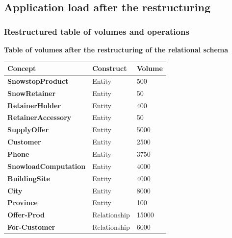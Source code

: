 \documentclass{article}[h]
\begin{document}
{{\pagebreak

\subsection{Application load after the restructuring}

\subsubsection{Restructured table of volumes and operations}

\vspace{12px}

{\centering \textbf{Table of volumes after the restructuring of the relational schema}\\}

\begin{table}[H]
  \def\arraystretch{1.25}%
  \centering
  \begin{tabular}{ | m{4.5cm} | m{4.5cm}| m{4.5cm} |}  
    \hline
    {\textbf{\large Concept}} & {\textbf{\large Construct}} & {\textbf{\large Volume}} \\ 
    \hline
    \color[HTML]{3531FF} \textbf{SnowstopProduct} & Entity & 500  \\ 
    \hline
    \color[HTML]{3531FF} \textbf{SnowRetainer} & Entity & 50 \\  
    \hline
    \color[HTML]{3531FF} \textbf{RetainerHolder} & Entity & 400 \\ 
    \hline
    \color[HTML]{3531FF} \textbf{RetainerAccessory} & Entity & 50 \\ 
    \hline
    \color[HTML]{3531FF} \textbf{SupplyOffer} & Entity & 5000\\  
    \hline
    \color[HTML]{3531FF} \textbf{Customer} & Entity & 2500\\ 
    \hline
    \color[HTML]{3531FF} \textbf{Phone} & Entity & 3750 \\ 
    \hline
    \color[HTML]{3531FF} \textbf{SnowloadComputation} & Entity & 4000\\  
    \hline
    \color[HTML]{3531FF} \textbf{BuildingSite} & Entity & 4000\\ 
    \hline
    \color[HTML]{3531FF} \textbf{City} & Entity & 8000 \\ 
    \hline
    \color[HTML]{3531FF} \textbf{Province} & Entity & 100 \\ 
    \hline
    \color[HTML]{3531FF} \textbf{Offer-Prod} & Relationship & 15000\\ 
    \hline
    \color[HTML]{3531FF} \textbf{For-Customer} & Relationship & 6000\\ 
    \hline
  \end{tabular}
\end{table}

}}
\end{document}
